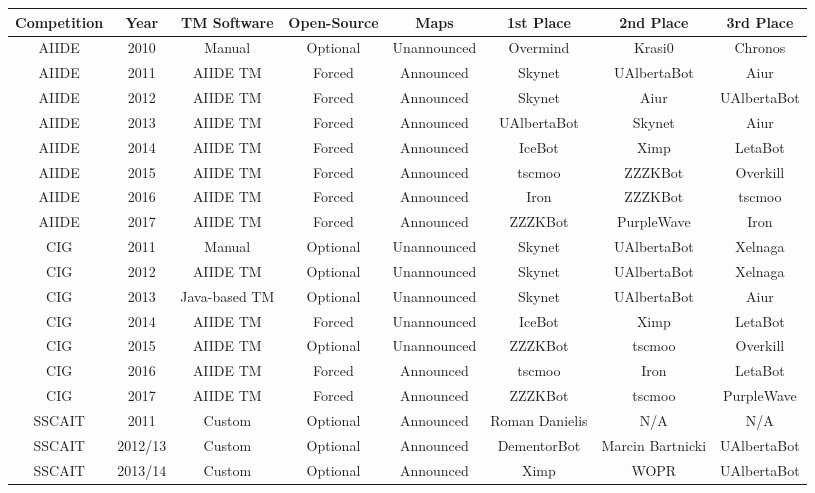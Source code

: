 
\begin{table}[t] 
 
 \begin{center}
 \begin{tabular} {| c | c | c c c | c c c |}
 \hline
 Competition & Year & TM Software & Open-Source & Maps & 1st Place & 2nd Place & 3rd Place\\
 \hline
 AIIDE & 2010 & Manual & Optional & Unannounced & Overmind & Krasi0 & Chronos \\
 \hline
 AIIDE & 2011 & AIIDE TM & Forced & Announced & Skynet & UAlbertaBot & Aiur \\
 \hline
 AIIDE & 2012 & AIIDE TM & Forced & Announced & Skynet & Aiur & UAlbertaBot\\
\hline
 AIIDE & 2013 & AIIDE TM & Forced & Announced & UAlbertaBot & Skynet & Aiur\\
\hline
 AIIDE & 2014 & AIIDE TM & Forced & Announced & IceBot & Ximp & LetaBot\\
\hline
 AIIDE & 2015 & AIIDE TM & Forced & Announced & tscmoo & ZZZKBot & Overkill\\
\hline
 AIIDE & 2016 & AIIDE TM & Forced & Announced & Iron & ZZZKBot & tscmoo\\
\hline
 AIIDE & 2017 & AIIDE TM & Forced & Announced & ZZZKBot & PurpleWave & Iron\\
\hline
 CIG & 2011 & Manual & Optional & Unannounced & Skynet & UAlbertaBot & Xelnaga\\
 \hline
 CIG & 2012 & AIIDE TM & Optional & Unannounced & Skynet & UAlbertaBot & Xelnaga\\
 \hline
 CIG & 2013 & Java-based TM & Optional & Unannounced & Skynet & UAlbertaBot & Aiur\\
 \hline
 CIG & 2014 & AIIDE TM & Forced & Unannounced & IceBot & Ximp & LetaBot\\
 \hline
 CIG & 2015 & AIIDE TM & Optional & Unannounced & ZZZKBot & tscmoo & Overkill\\
 \hline
 CIG & 2016 & AIIDE TM & Forced & Announced & tscmoo & Iron & LetaBot\\ 
 \hline
 CIG & 2017 & AIIDE TM & Forced & Announced & ZZZKBot & tscmoo & PurpleWave\\ 
 \hline   
 SSCAIT & 2011 & Custom & Optional & Announced & Roman Danielis & N/A & N/A\\
 \hline
 SSCAIT & 2012/13 & Custom & Optional & Announced & DementorBot & Marcin Bartnicki & UAlbertaBot\\
 \hline
 SSCAIT & 2013/14 & Custom & Optional & Announced & Ximp & WOPR & UAlbertaBot \\

\end{tabular}
\end{center}
\end{table}
